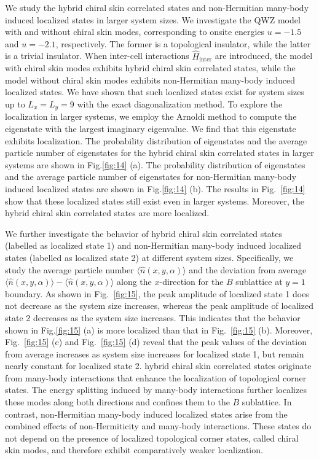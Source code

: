 \documentclass[longbibliography, aps, prx, amsmath, amssymb, amsfonts, twocolumn,superscriptaddress, footinbib]{revtex4-1}
\begin{document}
	We study the hybrid chiral skin correlated states and non-Hermitian many-body induced localized states in larger system sizes. 
	We investigate the QWZ model with and without chiral skin modes, corresponding to onsite energies $u=-1.5$ and $u=-2.1$, respectively. The former is a topological insulator, while the latter is a trivial insulator. When inter-cell interactions $\hat{H}_{\text{inter}}$ are introduced, the model with chiral skin modes exhibits hybrid chiral skin correlated states, while the model without chiral skin modes exhibits non-Hermitian many-body induced localized states.
	We have shown that such localized states exist for system sizes up to $L_x = L_y = 9$ with the exact diagonalization method. To explore the localization in larger systems, we employ the Arnoldi method to compute the eigenstate with the largest imaginary eigenvalue. 
	We find that this eigenstate exhibits localization.
	The probability distribution of eigenstates and the average particle number of eigenstates for the hybrid chiral skin correlated states in larger systems are shown in Fig.\ref{fig:14} (a). 
	The probability distribution of eigenstates and the average particle number of eigenstates for non-Hermitian many-body induced localized states are shown in Fig.\ref{fig:14} (b). The results in Fig.~\ref{fig:14} show that these localized states still exist even in larger systems. Moreover, the hybrid chiral skin correlated states are more localized.


	We further investigate the behavior of hybrid chiral skin correlated states (labelled as localized state 1) and non-Hermitian many-body induced localized states (labelled as localized state 2) at different system sizes. Specifically, we study the average particle number $\langle \hat{n}(x, y, \alpha) \rangle$ and the deviation from average $\langle \hat{n}(x, y, \alpha) \rangle - \overline{\langle \hat{n}(x, y, \alpha) \rangle}$ along the $x$-direction for the $B$ sublattice at $y = 1$ boundary.
	As shown in Fig.~\ref{fig:15}, the peak amplitude of localized state 1 does not decrease as the system size increases, whereas the peak amplitude of localized state 2 decreases as the system size increases. This indicates that the behavior shown in Fig.\ref{fig:15} (a) is more localized than that in Fig.~\ref{fig:15} (b).
	Moreover, Fig.~\ref{fig:15} (c) and Fig.~\ref{fig:15} (d) reveal that the peak values of the deviation from average increases as system size increases for localized state 1, but remain nearly constant for localized state 2.
	hybrid chiral skin correlated states originate from many-body interactions that enhance the localization of topological corner states. 
	The energy splitting induced by many-body interactions further localizes these modes along both directions and confines them to the $B$ sublattice.
	In contrast, non-Hermitian many-body induced localized states arise from the combined effects of non-Hermiticity and many-body interactions. These states do not depend on the presence of localized topological corner states, called chiral skin modes, and therefore exhibit comparatively weaker localization.
\end{document}

